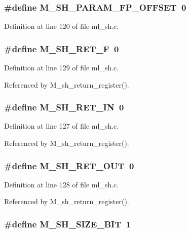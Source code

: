 \subsubsection{\setlength{\rightskip}{0pt plus 5cm}\#define M\_\-SH\_\-PARAM\_\-FP\_\-OFFSET~0}\label{ml__sh_8c_9945a6b38d4b290014a3d6f2398e362c}




Definition at line 120 of file ml\_\-sh.c.
\subsubsection{\setlength{\rightskip}{0pt plus 5cm}\#define M\_\-SH\_\-RET\_\-F~0}\label{ml__sh_8c_7dd0799721d94fe03ba6c26b6ba2c49f}




Definition at line 129 of file ml\_\-sh.c.

Referenced by M\_\-sh\_\-return\_\-register().
\subsubsection{\setlength{\rightskip}{0pt plus 5cm}\#define M\_\-SH\_\-RET\_\-IN~0}\label{ml__sh_8c_a0b19b6d13d3485e5742eb5082c72369}




Definition at line 127 of file ml\_\-sh.c.

Referenced by M\_\-sh\_\-return\_\-register().
\subsubsection{\setlength{\rightskip}{0pt plus 5cm}\#define M\_\-SH\_\-RET\_\-OUT~0}\label{ml__sh_8c_3639982c9173b4bf9bf3e7aa228d603b}




Definition at line 128 of file ml\_\-sh.c.

Referenced by M\_\-sh\_\-return\_\-register().
\subsubsection{\setlength{\rightskip}{0pt plus 5cm}\#define M\_\-SH\_\-SIZE\_\-BIT~1}\label{ml__sh_8c_7e4fec49315746414e841a2844b869a3}




